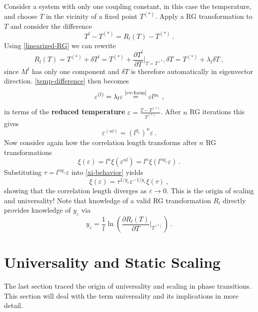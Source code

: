 	Consider a system with only one coupling constant, in this case the temperature, and choose $T$ in the vicinity of a fixed point $T^{(*)}$. Apply a RG transformation to $T$ and consider the difference
	\begin{equation} \label{temp-difference}
		T^l - T^{(*)} =	R_l(T) - T^{(*)}~.
	\end{equation}
	Using \autoref{linearized-RG} we can rewrite
	\begin{equation}
		R_l(T) =	T^{(*)} + \delta T^l =	T^{(*)} + \frac{\partial T^l}{\partial T} \bigg |_{T =	T^{(*)}} \delta T =	T^{(*)} + \lambda_l \delta T~,
	\end{equation}
	since $M^l$ has only one component and $\delta T$ is therefore automatically in eigenvector direction. \autoref{temp-difference} then becomes
	\def\equationautorefname{Eq.}
	\begin{equation} \label{coupling-constant-ev-scaling}
		\varepsilon^{(l)} =	\lambda_l \varepsilon \overset{\text{\autoref{ev-form}}}{=} \varepsilon l^{y_\varepsilon}~,
	\end{equation}\def\equationautorefname{Equation}
	in terms of the \textbf{reduced temperature} $ \varepsilon =	\frac{T - T^{(*)}}{T^{(*)}}$. After $n$ RG iterations this gives
	\begin{equation}
		\varepsilon^{(nl)} = \left( l^{y_\varepsilon}	\right)^n \varepsilon~.
	\end{equation}
	Now consider again how the correlation length transforms after $n$ RG transformations
	\begin{equation} \label{xi-behavior}
		\xi(\varepsilon) =	l^n \xi(\varepsilon^{nl}) =	l^n \xi( l^{ny_\varepsilon} \varepsilon)~.
	\end{equation}
	Substituting $\tau =	l^{ny_\varepsilon} \varepsilon$ into \autoref{xi-behavior} yields
	\begin{equation} \label{Eq::RG-xi-scaling}
		\xi(\varepsilon) =	\tau^{1 / y_\varepsilon} \varepsilon^{-1/ y_\varepsilon} \xi(\tau)~,
	\end{equation}
	showing that the correlation length diverges as $\varepsilon \rightarrow 0$. This is the origin of scaling and universality! Note that knowledge of a valid RG transformation $R_l$ directly provides knowledge of $y_\varepsilon$ via
	\begin{equation}
		y_\varepsilon =	\frac{1}{l} \ln \left(\frac{\partial R_l (T)}{\partial T} \bigg|_{T^{(*)}}\right)~.
	\end{equation}
	\section{Universality and Static Scaling} \label{Section::Universality}
	The last section traced the origin of universality and scaling in phase transitions. This section will deal with the term universality and its implications in more detail. \\
	

